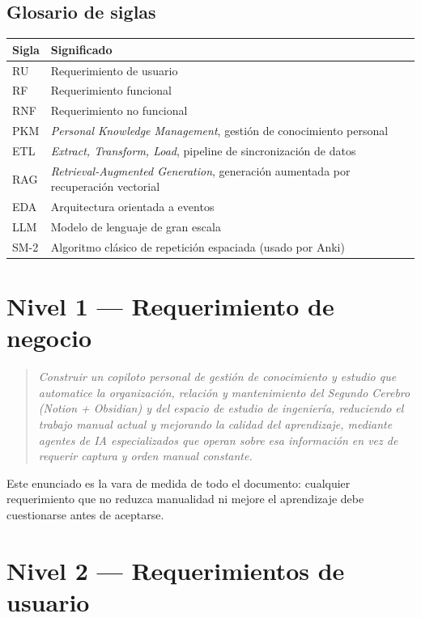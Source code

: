 \documentclass[11pt,a4paper]{article}
\begin{document}
\subsection*{Glosario de siglas}
\begin{longtable}{@{}p{2.6cm}p{11.5cm}@{}}
\toprule
Sigla & Significado \\
\midrule
\endhead
RU & Requerimiento de usuario \\
RF & Requerimiento funcional \\
RNF & Requerimiento no funcional \\
PKM & \emph{Personal Knowledge Management}, gestión de conocimiento personal \\
ETL & \emph{Extract, Transform, Load}, pipeline de sincronización de datos \\
RAG & \emph{Retrieval-Augmented Generation}, generación aumentada por recuperación vectorial \\
EDA & Arquitectura orientada a eventos \\
LLM & Modelo de lenguaje de gran escala \\
SM-2 & Algoritmo clásico de repetición espaciada (usado por Anki) \\
\bottomrule
\end{longtable}

\section{Nivel 1 --- Requerimiento de negocio}

\begin{quote}
\itshape
Construir un copiloto personal de gestión de conocimiento y estudio que automatice la organización, relación y mantenimiento del Segundo Cerebro (Notion + Obsidian) y del espacio de estudio de ingeniería, reduciendo el trabajo manual actual y mejorando la calidad del aprendizaje, mediante agentes de IA especializados que operan sobre esa información en vez de requerir captura y orden manual constante.
\end{quote}

Este enunciado es la vara de medida de todo el documento: cualquier requerimiento que no reduzca manualidad ni mejore el aprendizaje debe cuestionarse antes de aceptarse.

\section{Nivel 2 --- Requerimientos de usuario}
\end{document}
